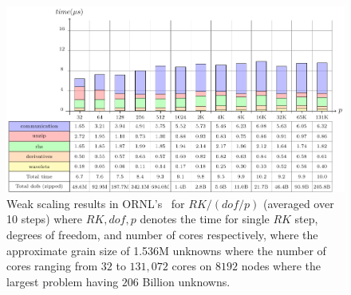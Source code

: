 \documentclass[10pt, conference]{IEEEtran} %
\begin{document}
\begin{figure}[tbh]
	\centering
	\includegraphics[width=0.8\columnwidth]{plots/weak_r10}
	\caption{\small Weak scaling results in ORNL's \Titan~for  $RK/(dof/p)$ (averaged over 10 steps) where $RK,dof,p$ denotes the time for single $RK$ step, degrees of freedom, and number of cores respectively, where the approximate grain size of 1.536M unknowns where the number of cores ranging from $32$ to $131,072$ cores on $8192$ nodes where the largest problem having $206$ Billion unknowns. \label{fig:ws_g1000} 
	}
	\vspace{-0.1in}
\end{figure}
\end{document}
